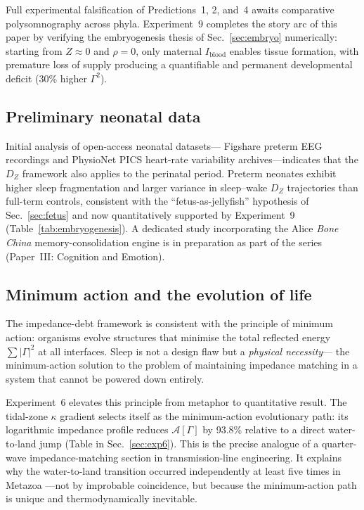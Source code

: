 ﻿\documentclass[aps,pre,twocolumn,superscriptaddress,floatfix]{revtex4-2}
\begin{document}
Full experimental falsification of Predictions~1, 2, and~4
awaits comparative polysomnography across phyla.
Experiment~9 completes the story arc of this paper by
verifying the embryogenesis thesis of Sec.~\ref{sec:embryo}
numerically: starting from $Z \approx 0$ and $\rho = 0$,
only maternal $I_{\mathrm{blood}}$ enables tissue formation,
with premature loss of supply producing a quantifiable
and permanent developmental deficit (30\% higher $\Gamma^2$).

\subsection{Preliminary neonatal data}

Initial analysis of open-access neonatal datasets---
Figshare preterm EEG recordings and PhysioNet PICS
heart-rate variability archives---indicates that the
$D_Z$ framework also applies to the perinatal period.
Preterm neonates exhibit higher sleep fragmentation and
larger variance in sleep--wake $D_Z$ trajectories
than full-term controls, consistent with the
``fetus-as-jellyfish'' hypothesis of Sec.~\ref{sec:fetus}
and now quantitatively supported by Experiment~9
(Table~\ref{tab:embryogenesis}).
A dedicated study incorporating the Alice
\emph{Bone China} memory-consolidation engine is
in preparation as part of the series
(Paper~III: Cognition and Emotion).

\subsection{Minimum action and the evolution of life}

The impedance-debt framework is consistent with the
principle of minimum action:
organisms evolve structures that minimise the
total reflected energy $\sum |\Gamma|^2$
at all interfaces.
Sleep is not a design flaw but a \emph{physical necessity}---
the minimum-action solution to the problem of
maintaining impedance matching in a system that
cannot be powered down entirely.

Experiment~6 elevates this principle from metaphor to
quantitative result.
The tidal-zone $\kappa$ gradient selects itself
as the minimum-action evolutionary path:
its logarithmic impedance profile reduces
$\mathcal{A}[\Gamma]$ by 93.8\% relative to a direct
water-to-land jump (Table in Sec.~\ref{sec:exp6}).
This is the precise analogue of a quarter-wave
impedance-matching section in transmission-line engineering.
It explains why the water-to-land transition occurred
independently at least five times in Metazoa
---not by improbable coincidence,
but because the minimum-action path is unique
and thermodynamically inevitable.
\end{document}
